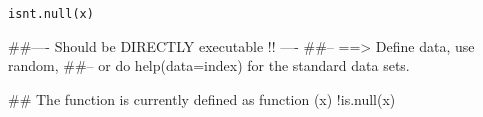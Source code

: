 \begin{Usage}
\begin{verbatim}
isnt.null(x)
\end{verbatim}
\end{Usage}
\begin{Arguments}
\begin{ldescription}
\item[\code{x}] 
\end{ldescription}
\end{Arguments}
\begin{Examples}
\begin{ExampleCode}
##---- Should be DIRECTLY executable !! ----
##-- ==>  Define data, use random,
##--    or do  help(data=index)  for the standard data sets.

## The function is currently defined as
function (x) 
{
    !is.null(x)
  }
\end{ExampleCode}
\end{Examples}

